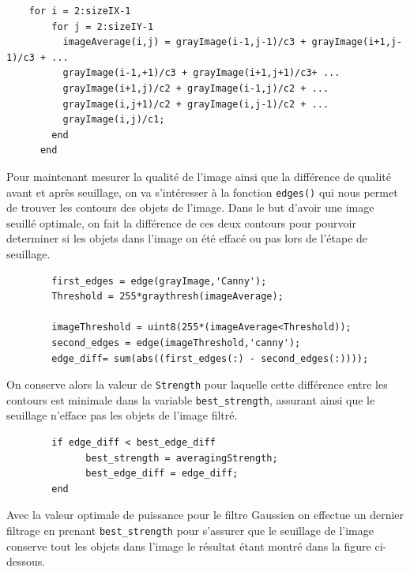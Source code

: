 \documentclass[11pt, openright]{book}
\begin{document}
\begin{lstlisting}
	for i = 2:sizeIX-1
    	for j = 2:sizeIY-1
	      imageAverage(i,j) = grayImage(i-1,j-1)/c3 + grayImage(i+1,j-1)/c3 + ...
	      grayImage(i-1,+1)/c3 + grayImage(i+1,j+1)/c3+ ...
	      grayImage(i+1,j)/c2 + grayImage(i-1,j)/c2 + ... 
	      grayImage(i,j+1)/c2 + grayImage(i,j-1)/c2 + ...
	      grayImage(i,j)/c1;
	    end
	  end
\end{lstlisting}
			Pour maintenant mesurer la qualité de l'image ainsi que la différence de qualité avant et après seuillage, on va s'intéresser à la fonction \texttt{edges()} qui nous permet de trouver les contours des objets de l'image. Dans le but d'avoir une image seuillé optimale, on fait la différence de ces deux contours pour pourvoir determiner si les objets dans l'image on été effacé ou pas lors de l'étape de seuillage.
			\begin{lstlisting}
		first_edges = edge(grayImage,'Canny');
  		Threshold = 255*graythresh(imageAverage);

  		imageThreshold = uint8(255*(imageAverage<Threshold));
  		second_edges = edge(imageThreshold,'canny');
  		edge_diff= sum(abs((first_edges(:) - second_edges(:))));
			\end{lstlisting}	
			On conserve alors la valeur de \texttt{Strength} pour laquelle cette différence entre les contours est minimale dans la variable \texttt{best\_strength}, assurant ainsi que le seuillage n'efface pas les objets de l'image filtré.
			\begin{lstlisting}
		if edge_diff < best_edge_diff 
    		  best_strength = averagingStrength;
        	  best_edge_diff = edge_diff;
  		end 
			\end{lstlisting}
			Avec la valeur optimale de puissance pour le filtre Gaussien on effectue un dernier filtrage en prenant \texttt{best\_strength} pour s'assurer que le seuillage de l'image conserve tout les objets dans l'image le résultat étant montré dans la figure ci-dessous. 
\end{document}
